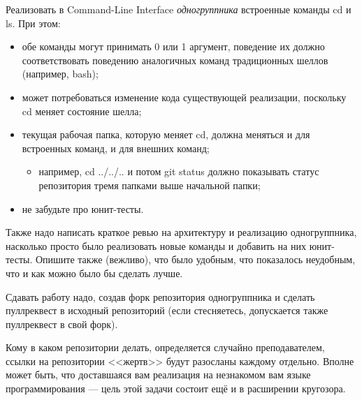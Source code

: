 \documentclass[a5paper]{homework}
\begin{document}

Реализовать в Command-Line Interface \emph{одногруппника} встроенные команды cd и ls. При этом:

\begin{itemize}
    \item обе команды могут принимать 0 или 1 аргумент, поведение их должно соответствовать поведению аналогичных команд традиционных шеллов (например, bash);
    \item может потребоваться изменение кода существующей реализации, поскольку cd меняет состояние шелла;
    \item текущая рабочая папка, которую меняет cd, должна меняться и для встроенных команд, и для внешних команд;
    \begin{itemize}
        \item например, cd ../../.. и потом git status должно показывать статус репозитория тремя папками выше начальной папки;
    \end{itemize}
    \item не забудьте про юнит-тесты.
\end{itemize}

Также надо написать краткое ревью на архитектуру и реализацию одногруппника, насколько просто было реализовать новые команды и добавить на них юнит-тесты. Опишите также (вежливо), что было удобным, что показалось неудобным, что и как можно было бы сделать лучше.

Сдавать работу надо, создав форк репозитория одногруппника и сделать пуллреквест в исходный репозиторий (если стесняетесь, допускается также пуллреквест в свой форк).

Кому в каком репозитории делать, определяется случайно преподавателем, ссылки на репозитории <<жертв>> будут разосланы каждому отдельно. Вполне может быть, что доставшаяся вам реализация на незнакомом вам языке программирования --- цель этой задачи состоит ещё и в расширении кругозора.
\end{document}
